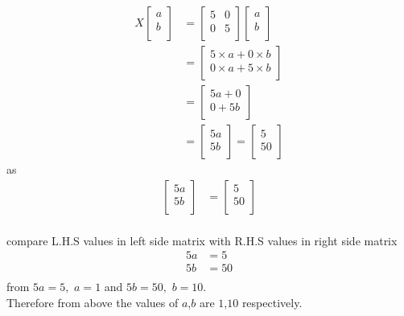 \documentclass{article}
\begin{document}
    \begin{align}
  X\begin{bmatrix}
  a\\
  b\\
  \end{bmatrix} & = \begin{bmatrix}
  5 & 0\\
  0 & 5\\
  \end{bmatrix}
 \begin{bmatrix}
 a\\
 b\\
 \end{bmatrix}
 \nonumber\\
                            & = \begin{bmatrix}
                            5 \times a + 0 \times b\\
                            0 \times a + 5 \times b\\
                            \end{bmatrix}
                            \nonumber\\
                            & = \begin{bmatrix}
                            5a+0\\
                            0+5b\\
                            \end{bmatrix}
                            \nonumber\\
                            & = \begin{bmatrix}
                            5a\\
                            5b\\
                            \end{bmatrix} = \begin{bmatrix}
                            5\\
                            50\\
                            \end{bmatrix}
                            \end{align}as \begin{align}
                            \begin{bmatrix}
        5a\\
        5b\\
        \end{bmatrix} & = \begin{bmatrix}
        5\\
        50\\
        \end{bmatrix}
        \nonumber\\
        \end{align}
        
       compare L.H.S values in left side matrix with R.H.S values in right side matrix
\begin{align}
5a & = 5\nonumber\\
5b & = 50\nonumber\\
\end{align}
from $5a=5,$ $a = 1$ and $5b=50,$ $b=10.$\\
Therefore from above the values of $a$,$b$ are $1$,$10$ respectively.
   
\end{document}
